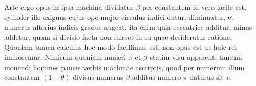 Arte ergo opus%
in ipsa machina%
dividatur $\beta$ per
constantem%
\ledpb%
id vero facile est,
cylinder ille exiguus%
cujus ope major circulus%
indici datur,
diminuatur,
et numerus
alterius indicis gradus augeat,%
%
ita enim
quia eccentrice additur,
minus addetur,
quam si divisio facta non fuisset %
in ea quae desideratur ratione.
Quoniam tamen calculus hoc modo facillimus est,%
non opus est
ut huic rei immoremur.
Nimirum
quoniam numeri $\pi$ et $\beta$ statim visu apparent,
tantum monendi homines%
paucis verbis machinae ascriptis,%
quod per numerum illum constantem $(1 - \theta)$%
divisus numerus $\beta$
additus numero $\pi$
daturus sit \textit{v}.
\pend%
%
\frenchspacing%
\normalsize%
